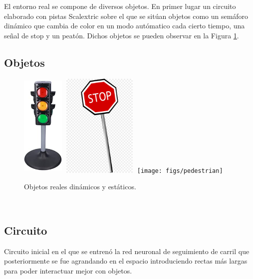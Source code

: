 El entorno real se compone de diversos objetos. En primer lugar un circuito elaborado con pistas Scalextric sobre el que se sitúan objetos como un semáforo dinámico que cambia de color en un modo autómatico cada cierto tiempo, una señal de stop y un peatón. Dichos objetos se pueden observar en la Figura \ref{fig:objects}.\\

\subsection{Objetos}

\begin{figure} [h!]
	\begin{center}
		\includegraphics[width=2cm, height=5cm]{figs/trafficlightreal}\hspace{0.1cm}\includegraphics[width=4cm,
			height=5cm]{figs/stopsign}\hspace{0.1cm}\texttt{[image: figs/pedestrian]}
	\end{center}
	\caption{Objetos reales dinámicos y estáticos.}
	\label{fig:objects}
\end{figure}\

\subsection{Circuito}
Circuito inicial en el que se entrenó la red neuronal de seguimiento de carril que posteriormente se fue agrandando en el espacio introduciendo rectas más largas para poder interactuar mejor con objetos.\\

